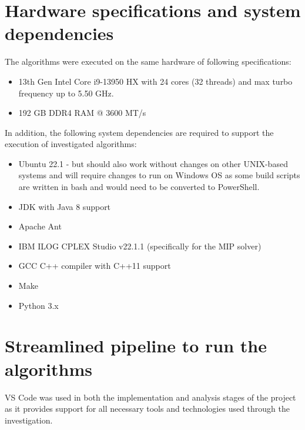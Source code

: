 \documentclass[a4paper,12pt]{Classes/RoboticsLaTeX}
\begin{document}
\section{Hardware specifications and system dependencies}

The algorithms were executed on the same hardware of following specifications:

\begin{itemize} \setlength\itemsep{0em} \setlength\parskip{0pt} \setlength\parsep{0pt}
    \item 13th Gen Intel Core i9-13950 HX with 24 cores (32 threads) and max turbo frequency up to 5.50 GHz.
    \item 192 GB DDR4 RAM @ 3600 MT/s
\end{itemize}

In addition, the following system dependencies are required to support
the execution of investigated algorithms:

\begin{itemize} \setlength\itemsep{0em} \setlength\parskip{0pt} \setlength\parsep{0pt}
    \item  Ubuntu 22.1 - but should also work without changes on other UNIX-based systems and will require changes to run on Windows OS as some build scripts are written in bash and would need to be converted to PowerShell.
    \item JDK with Java 8 support
    \item Apache Ant
    \item IBM ILOG CPLEX Studio v22.1.1 (specifically for the MIP solver)
    \item GCC C++ compiler with C++11 support
    \item Make
    \item Python 3.x
\end{itemize}

\section{Streamlined pipeline to run the algorithms}

VS Code was used in both the implementation and analysis stages of the project as it provides support for all necessary tools and technologies used through the investigation.
\end{document}
